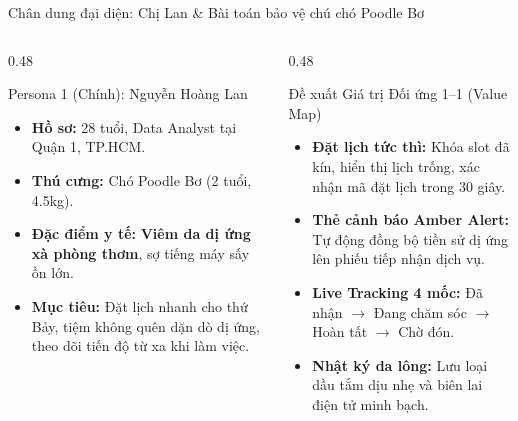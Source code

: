 \begin{frame}{Chân dung đại diện: Chị Lan \& Bài toán bảo vệ chú chó Poodle Bơ}
  \begin{columns}[T]
    \begin{column}{0.48\textwidth}
      \begin{block}{Persona 1 (Chính): Nguyễn Hoàng Lan}
        \begin{itemize}
          \item \textbf{Hồ sơ:} 28 tuổi, Data Analyst tại Quận 1, TP.HCM.
          \item \textbf{Thú cưng:} Chó Poodle Bơ (2 tuổi, 4.5kg).
          \item \textbf{Đặc điểm y tế:} \alert{\textbf{Viêm da dị ứng xà phòng thơm}}, sợ tiếng máy sấy ồn lớn.
          \item \textbf{Mục tiêu:} Đặt lịch nhanh cho thứ Bảy, tiệm không quên dặn dò dị ứng, theo dõi tiến độ từ xa khi làm việc.
        \end{itemize}
      \end{block}
    \end{column}

    \begin{column}{0.48\textwidth}
      \begin{exampleblock}{Đề xuất Giá trị Đối ứng 1--1 (Value Map)}
        \begin{itemize}
          \item \textbf{Đặt lịch tức thì:} Khóa slot đã kín, hiển thị lịch trống, xác nhận mã đặt lịch trong 30 giây.
          \item \textbf{Thẻ cảnh báo Amber Alert:} Tự động đồng bộ tiền sử dị ứng lên phiếu tiếp nhận dịch vụ.
          \item \textbf{Live Tracking 4 mốc:} Đã nhận $\rightarrow$ Đang chăm sóc $\rightarrow$ Hoàn tất $\rightarrow$ Chờ đón.
          \item \textbf{Nhật ký da lông:} Lưu loại dầu tắm dịu nhẹ và biên lai điện tử minh bạch.
        \end{itemize}
      \end{exampleblock}
    \end{column}
  \end{columns}
\end{frame}

